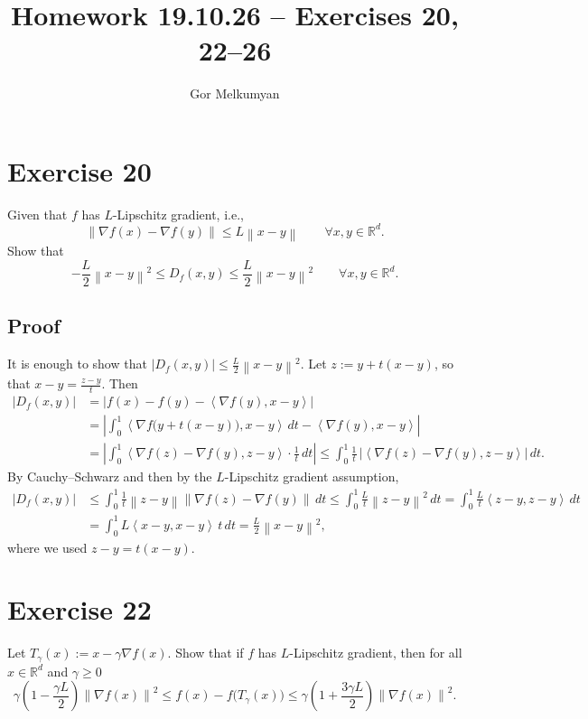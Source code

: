 \documentclass[11pt,a4paper]{article}
\title{Homework 19.10.26 -- Exercises 20, 22--26}
\author{Gor Melkumyan}
\date{}
\newcommand{\R}{\mathbb{R}}
\newcommand{\norm}[1]{\left\| #1 \right\|}
\newcommand{\ip}[2]{\left\langle #1, #2 \right\rangle}
\begin{document}
\maketitle

\section*{Exercise 20}

Given that $f$ has $L$-Lipschitz gradient, i.e.,
\[
  \norm{\nabla f(x) - \nabla f(y)} \le L\norm{x-y} \qquad \forall x, y \in \R^d .
\]
Show that
\[
  -\frac{L}{2}\norm{x-y}^2 \le D_f(x,y) \le \frac{L}{2}\norm{x-y}^2 \qquad \forall x, y \in \R^d .
\]

\subsection*{Proof}
It is enough to show that $|D_f(x,y)| \le \frac{L}{2}\norm{x-y}^2$.
Let $z := y + t(x-y)$, so that $x - y = \frac{z-y}{t}$. Then
\begin{align*}
  |D_f(x,y)|
  &= \bigl|f(x) - f(y) - \ip{\nabla f(y)}{x-y}\bigr|
  \\
  &= \left|\int_0^1 \ip{\nabla f\bigl(y + t(x-y)\bigr)}{x-y}\,dt - \ip{\nabla f(y)}{x-y}\right| \\
  &= \left|\int_0^1 \ip{\nabla f(z) - \nabla f(y)}{z-y}\cdot\frac{1}{t}\,dt\right|
  \le \int_0^1 \frac{1}{t}\,\bigl|\ip{\nabla f(z) - \nabla f(y)}{z-y}\bigr|\,dt .
\end{align*}
By Cauchy--Schwarz and then by the $L$-Lipschitz gradient assumption,
\begin{align*}
  |D_f(x,y)|
  &\le \int_0^1 \frac{1}{t}\norm{z-y}\norm{\nabla f(z) - \nabla f(y)}\,dt
  \le \int_0^1 \frac{L}{t}\norm{z-y}^2\,dt
  = \int_0^1 \frac{L}{t}\ip{z-y}{z-y}\,dt \\
  &= \int_0^1 L\ip{x-y}{x-y}\,t\,dt
  = \frac{L}{2}\norm{x-y}^2,
\end{align*}
where we used $z - y = t(x-y)$.

\section*{Exercise 22}

Let $T_\gamma(x) := x - \gamma\nabla f(x)$. Show that if $f$ has $L$-Lipschitz gradient, then
for all $x \in \R^d$ and $\gamma \ge 0$
\[
  \gamma\left(1 - \frac{\gamma L}{2}\right)\norm{\nabla f(x)}^2
  \le f(x) - f\bigl(T_\gamma(x)\bigr)
  \le \gamma\left(1 + \frac{3\gamma L}{2}\right)\norm{\nabla f(x)}^2 .
\]
\end{document}
